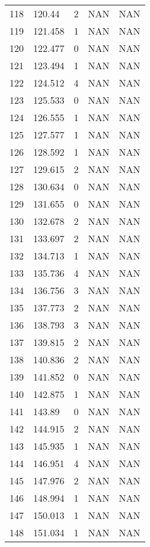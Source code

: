 \documentclass{article}
\begin{document}
\begin{longtable}{@{}lllll@{}}
				118 & 120.44  & 2     & NAN   & NAN   \\
				119 & 121.458 & 1     & NAN   & NAN   \\
				120 & 122.477 & 0     & NAN   & NAN   \\
				121 & 123.494 & 1     & NAN   & NAN   \\
				122 & 124.512 & 4     & NAN   & NAN   \\
				123 & 125.533 & 0     & NAN   & NAN   \\
				124 & 126.555 & 1     & NAN   & NAN   \\
				125 & 127.577 & 1     & NAN   & NAN   \\
				126 & 128.592 & 1     & NAN   & NAN   \\
				127 & 129.615 & 2     & NAN   & NAN   \\
				128 & 130.634 & 0     & NAN   & NAN   \\
				129 & 131.655 & 0     & NAN   & NAN   \\
				130 & 132.678 & 2     & NAN   & NAN   \\
				131 & 133.697 & 2     & NAN   & NAN   \\
				132 & 134.713 & 1     & NAN   & NAN   \\
				133 & 135.736 & 4     & NAN   & NAN   \\
				134 & 136.756 & 3     & NAN   & NAN   \\
				135 & 137.773 & 2     & NAN   & NAN   \\
				136 & 138.793 & 3     & NAN   & NAN   \\
				137 & 139.815 & 2     & NAN   & NAN   \\
				138 & 140.836 & 2     & NAN   & NAN   \\
				139 & 141.852 & 0     & NAN   & NAN   \\
				140 & 142.875 & 1     & NAN   & NAN   \\
				141 & 143.89  & 0     & NAN   & NAN   \\
				142 & 144.915 & 2     & NAN   & NAN   \\
				143 & 145.935 & 1     & NAN   & NAN   \\
				144 & 146.951 & 4     & NAN   & NAN   \\
				145 & 147.976 & 2     & NAN   & NAN   \\
				146 & 148.994 & 1     & NAN   & NAN   \\
				147 & 150.013 & 1     & NAN   & NAN   \\
				148 & 151.034 & 1     & NAN   & NAN   \\

\end{longtable}
\end{document}

